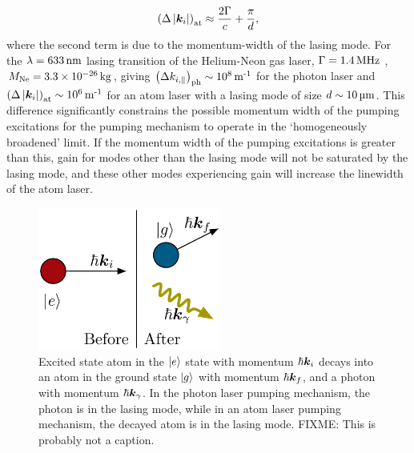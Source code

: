 \begin{align*}
    \left(\Delta \left|\bm{k}_{i}\right|\right)_\text{at} \approx \frac{2 \Gamma}{c} + \frac{\pi}{d},
\end{align*}
where the second term is due to the momentum-width of the lasing mode.  For the $\lambda = \unit[633]{nm}$ lasing transition of the Helium-Neon gas laser, $\Gamma = \unit[1.4]{MHz}$ \citep[Table~13.2-1]{SalehTeich}, $M_\text{Ne} = 3.3 \times \unit[10^{-26}]{kg}$, giving $\left(\Delta k_{i,\parallel}\right)_\text{ph} \sim \unit[10^8]{m\textsuperscript{-1}}$ for the photon laser and $\left(\Delta \abs{\vect{k}_{i}}\right)_\text{at} \sim \unit[10^{6}]{m\textsuperscript{-1}}$ for an atom laser with a lasing mode of size $d \sim \unit[10]{\micro m}$.  This difference significantly constrains the possible momentum width of the pumping excitations for the pumping mechanism to operate in the `homogeneously broadened' limit.  If the momentum width of the pumping excitations is greater than this, gain for modes other than the lasing mode will not be saturated by the lasing mode, and these other modes experiencing gain will increase the linewidth of the atom laser.  

\begin{figure}
    \centering
    \includegraphics[width=6cm]{AtomDecay}
    \caption{
        \label{Introduction:AtomDecay}
        Excited state atom in the ${\left|e\right>}$ state with momentum $\hbar \bm{k}_i$ decays into an atom in the ground state ${\left|g\right>}$ with momentum $\hbar \bm{k}_f$, and a photon with momentum $\hbar \bm{k}_\gamma$.  In the photon laser pumping mechanism, the photon is in the lasing mode, while in an atom laser pumping mechanism, the decayed atom is in the lasing mode.  FIXME: This is probably not a caption.
    }
\end{figure}

